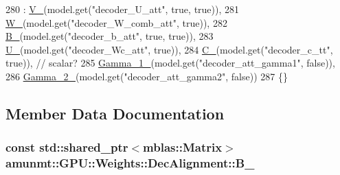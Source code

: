 \begin{DoxyCode}
280     : \hyperlink{structamunmt_1_1GPU_1_1Weights_1_1DecAlignment_a9af90c7f1194d739a6f015e8d93fb109}{V\_}(model.get(\textcolor{stringliteral}{"decoder\_U\_att"}, \textcolor{keyword}{true}, \textcolor{keyword}{true})),
281       \hyperlink{structamunmt_1_1GPU_1_1Weights_1_1DecAlignment_a7fe1c5f67b1350cde0dd5ab80120dbe1}{W\_}(model.get(\textcolor{stringliteral}{"decoder\_W\_comb\_att"}, \textcolor{keyword}{true})),
282       \hyperlink{structamunmt_1_1GPU_1_1Weights_1_1DecAlignment_a7f9979c53d53138f6806e3934e576db3}{B\_}(model.get(\textcolor{stringliteral}{"decoder\_b\_att"}, \textcolor{keyword}{true}, \textcolor{keyword}{true})),
283       \hyperlink{structamunmt_1_1GPU_1_1Weights_1_1DecAlignment_a7e119604736681821ea48cbc50154511}{U\_}(model.get(\textcolor{stringliteral}{"decoder\_Wc\_att"}, \textcolor{keyword}{true})),
284       \hyperlink{structamunmt_1_1GPU_1_1Weights_1_1DecAlignment_a3952c253436d75dc9e4ffedc1084eae9}{C\_}(model.get(\textcolor{stringliteral}{"decoder\_c\_tt"}, \textcolor{keyword}{true})), \textcolor{comment}{// scalar?}
285       \hyperlink{structamunmt_1_1GPU_1_1Weights_1_1DecAlignment_ad3ae4a95e58488e0ec98a85c0d119d5f}{Gamma\_1\_}(model.get(\textcolor{stringliteral}{"decoder\_att\_gamma1"}, \textcolor{keyword}{false})),
286       \hyperlink{structamunmt_1_1GPU_1_1Weights_1_1DecAlignment_abdca6855824dfda07fe9c2d49c1e9a5e}{Gamma\_2\_}(model.get(\textcolor{stringliteral}{"decoder\_att\_gamma2"}, \textcolor{keyword}{false}))
287     \{\}
\end{DoxyCode}


\subsection{Member Data Documentation}
\subsubsection[{\texorpdfstring{B\+\_\+}{B_}}]{\setlength{\rightskip}{0pt plus 5cm}const std\+::shared\+\_\+ptr$<${\bf mblas\+::\+Matrix}$>$ amunmt\+::\+G\+P\+U\+::\+Weights\+::\+Dec\+Alignment\+::\+B\+\_\+}\hypertarget{structamunmt_1_1GPU_1_1Weights_1_1DecAlignment_a7f9979c53d53138f6806e3934e576db3}{}\label{structamunmt_1_1GPU_1_1Weights_1_1DecAlignment_a7f9979c53d53138f6806e3934e576db3}


